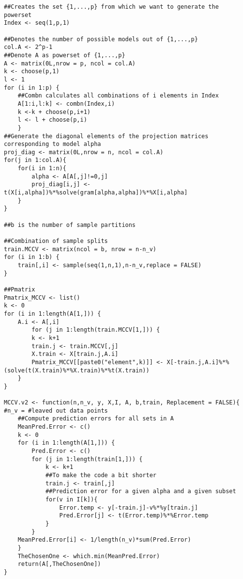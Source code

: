 \documentclass[Research_Module_ES.tex]{subfiles}
\begin{document}
\begin{lstlisting}[title={Monte Carlo Cross-Validation Function (Speeded up Version)}]
##Creates the set {1,...,p} from which we want to generate the powerset
Index <- seq(1,p,1)    

##Denotes the number of possible models out of {1,...,p}
col.A <- 2^p-1
##Denote A as powerset of {1,...,p}
A <- matrix(0L,nrow = p, ncol = col.A)      
k <- choose(p,1)
l <- 1
for (i in 1:p) {
	##Combn calculates all combinations of i elements in Index 
	A[1:i,l:k] <- combn(Index,i)             
	k <-k + choose(p,i+1)
	l <- l + choose(p,i)
	}
##Generate the diagonal elements of the projection matrices corresponding to model alpha
proj_diag <- matrix(0L,nrow = n, ncol = col.A)
for(j in 1:col.A){
	for(i in 1:n){
		alpha <- A[A[,j]!=0,j]
		proj_diag[i,j] <- t(X[i,alpha])%*%solve(gram[alpha,alpha])%*%X[i,alpha]
	}
}

##b is the number of sample partitions

##Combination of sample splits
train.MCCV <- matrix(ncol = b, nrow = n-n_v)
for (i in 1:b) {
	train[,i] <- sample(seq(1,n,1),n-n_v,replace = FALSE)
}

##Pmatrix
Pmatrix_MCCV <- list()
k <- 0
for (i in 1:length(A[1,])) {
	A.i <- A[,i]
		for (j in 1:length(train.MCCV[1,])) {
		k <- k+1
		train.j <- train.MCCV[,j]
		X.train <- X[train.j,A.i] 
		Pmatrix_MCCV[[paste0("element",k)]] <- X[-train.j,A.i]%*%(solve(t(X.train)%*%X.train)%*%t(X.train))
	}
}

MCCV.v2 <- function(n,n_v, y, X,I, A, b,train, Replacement = FALSE){         #n_v = #leaved out data points
    ##Compute prediction errors for all sets in A
	MeanPred.Error <- c()
	k <- 0
	for (i in 1:length(A[1,])) {
		Pred.Error <- c()
		for (j in 1:length(train[1,])) {
			k <- k+1
			##To make the code a bit shorter
			train.j <- train[,j]                 
			##Prediction error for a given alpha and a given subset
			for(v in I[k]){
				Error.temp <- y[-train.j]-v%*%y[train.j]
				Pred.Error[j] <- t(Error.temp)%*%Error.temp
			}
		}
	MeanPred.Error[i] <- 1/length(n_v)*sum(Pred.Error)
	}
	TheChosenOne <- which.min(MeanPred.Error)
	return(A[,TheChosenOne])
}

\end{lstlisting}
\end{document}
